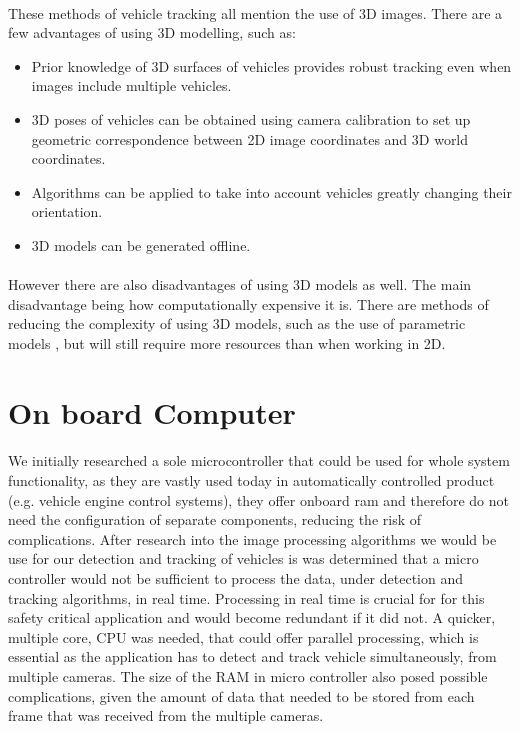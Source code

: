 \documentclass[a4paper]{report}
\begin{document}
\paragraph{}These methods of vehicle tracking all mention the use of 3D images. There are a few advantages of using 3D modelling, such as:
\begin{itemize}
\item Prior knowledge of 3D surfaces of vehicles provides robust tracking even when images include multiple vehicles.
\item 3D poses of vehicles can be obtained using camera calibration to set up geometric correspondence between 2D image coordinates and 3D world coordinates. 
\item Algorithms can be applied to take into account vehicles greatly changing their orientation.
\item 3D models can be generated offline.
\end{itemize}
\paragraph{}However there are also disadvantages of using 3D models as well. The main disadvantage being how computationally expensive it is. There are methods of reducing the complexity of using 3D models, such as the use of parametric models \citep{kollnig19973d}, but will still require more resources than when working in 2D.

\section{On board Computer}
\label{sec:computer}

\paragraph{}We initially researched a sole microcontroller that could be used for whole system functionality, as they are vastly used today in automatically controlled product (e.g. vehicle engine control systems), they offer onboard ram and therefore do not need the configuration of separate components, reducing the risk of complications.  After research into the image processing algorithms we would be use for our detection and tracking of vehicles is was determined that a micro controller would not be sufficient to process the data, under detection and tracking algorithms, in real time. Processing in real time is crucial for for this safety critical application and would become redundant if it did not. A quicker, multiple core, CPU was needed, that could offer parallel processing, which is essential as the application has to detect and track vehicle simultaneously, from multiple cameras. The size of the RAM in micro controller also posed possible complications, given the amount of data that needed to be stored from each frame that was received from the multiple cameras.
\end{document}
